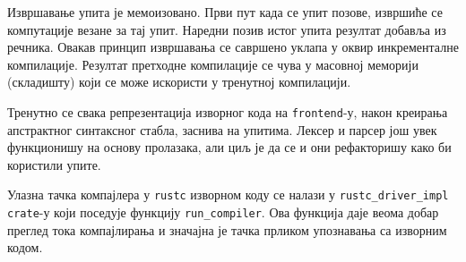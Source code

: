 Извршавање упита је мемоизовано. Први пут када се упит позове, извршиће се компутације 
везане за тај упит. Наредни позив истог упита резултат добавља из речника.
Овакав принцип извршавања се савршено уклапа у оквир инкременталне компилације. 
Резултат претходне компилације се чува у масовној меморији (складишту) који се може искористи
у тренутној компилацији.

Тренутно се свака репрезентација изворног кода на \verb|frontend|-у, 
након креирања апстрактног синтаксног стабла, заснива на упитима. 
Лексер и парсер још увек функционишу на основу пролазака, 
али циљ је да се и они рефакторишу како би користили упите.

Улазна тачка компајлера у \verb|rustc| изворном коду се налази у \verb|rustc_driver_impl| \verb|crate|-у
који поседује функцију \verb|run_compiler|. Ова функција даје веома добар преглед тока компајлирања 
и значајна је тачка прликом упознавања са изворним кодом. 